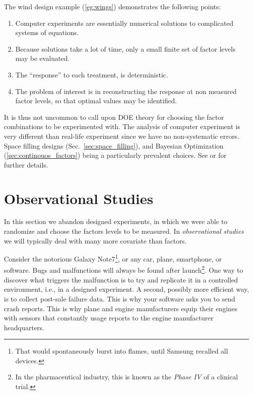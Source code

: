 The wind design example (\ref{eg:wings}) demonstrates the following points:
\begin{enumerate}
\item Computer experiments are essentially numerical solutions to complicated systems of equations.
\item Because solutions take a lot of time, only a small finite set of factor levels may be evaluated. 
\item The ``response'' to each treatment, is deterministic. 
\item The problem of interest is in reconstructing the response at non measured factor levels, so that optimal values may be identified. 
\end{enumerate}
It is thus not uncommon to call upon DOE theory for choosing the factor combinations to be experimented with. The analysis of computer experiment is very different than real-life experiment since we have no non-systematic errors. 
Space filling designs (Sec.~\ref{sec:space_filling}), and Bayesian Optimization (\ref{sec:continouos_factors}) being a particularly prevalent choices. 
See \cite{sacks_design_1989} or \cite{santner_design_2013} for further details. 








\section{Observational Studies}
\label{sec:observational}

In this section we abandon designed experiments, in which we were able to randomize and choose the factors levels to be measured.
In \emph{observational studies} we will typically deal with many more covariate than factors. 


\begin{example}
	\label{ex:post-sale}
	Consider the notorious Galaxy Note7\footnote{That would spontaneously burst into flames, until Samsung recalled all devices.}, or any car, plane, smartphone, or software. 
	Bugs and malfunctions will always be found after launch\footnote{In the pharmaceutical industry, this is known as the \emph{Phase IV} of a clinical trial.}.
	One way to discover what triggers the malfunction is to try and replicate it in a controlled environment, i.e., in a designed experiment. 
	A second, possibly more efficient way, is to collect post-sale failure data.
	This is why your software asks you to send crash reports. 
	This is why plane and engine manufacturers equip their engines with sensors that constantly usage reports to the engine manufacturer headquarters. 	
\end{example}


